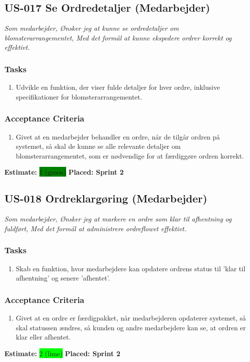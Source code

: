 \subsection{US-017 Se Ordredetaljer (Medarbejder)}
\label{sec:US-017}
\textit{Som medarbejder, Ønsker jeg at kunne se ordredetaljer om blomsterarrangementet, Med det formål at kunne ekspedere ordrer korrekt og effektivt.}
\subsubsection*{\textbf{Tasks}}
\begin{enumerate}
  \item Udvikle en funktion, der viser fulde detaljer for hver ordre, inklusive specifikationer for blomsterarrangementet.
\end{enumerate}
\subsubsection*{\textbf{Acceptance Criteria}}
\begin{enumerate}
  \item Givet at en medarbejder behandler en ordre, når de tilgår ordren på systemet, så skal de kunne se alle relevante detaljer om blomsterarrangementet, som er nødvendige for at færdiggøre ordren korrekt.
\end{enumerate}
\textbf{Estimate:} \colorbox{green}{1 (green)}
\textbf{Placed: Sprint 2}
\par\noindent\dotfill

\subsection{US-018 Ordreklargøring (Medarbejder)}
\label{sec:US-018}
\textit{Som medarbejder, Ønsker jeg at markere en ordre som klar til afhentning og fuldført, Med det formål at administrere ordreflowet effektivt.}
\subsubsection*{\textbf{Tasks}}
\begin{enumerate}
  \item Skab en funktion, hvor medarbejdere kan opdatere ordrens status til 'klar til afhentning' og senere 'afhentet'.
\end{enumerate}
\subsubsection*{\textbf{Acceptance Criteria}}
\begin{enumerate}
  \item Givet at en ordre er færdigpakket, når medarbejderen opdaterer systemet, så skal statussen ændres, så kunden og andre medarbejdere kan se, at ordren er klar eller afhentet.
\end{enumerate}
\textbf{Estimate:} \colorbox{lime}{2 (lime)}
\textbf{Placed: Sprint 2}
\par\noindent\dotfill

